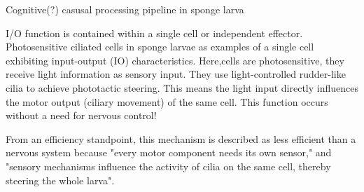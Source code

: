 \documentclass[10pt, aspectratio=169, handout]{beamer}
\begin{document}
\begin{frame}[label=sponge_larva]{ Cognitive(?) casusal processing pipeline in sponge larva}
{
    }

    \begin{center}
    I/O function is contained within a single cell or independent effector. Photosensitive ciliated cells in sponge larvae as examples of a single cell exhibiting input-output (IO) characteristics. Here,cells are photosensitive, they receive light information as sensory input. They use light-controlled rudder-like cilia to achieve phototactic steering. This means the light input directly influences the motor output (ciliary movement) of the same cell.
This function occurs without a need for nervous control!

From an efficiency standpoint, this mechanism is described as less efficient than a nervous system because "every motor component needs its own sensor," and "sensory mechanisms influence the activity of cilia on the same cell, thereby steering the whole larva". \autocite{jekelyOptionSpaceEarly2015}
 
    \end{center}



\end{frame}
\end{document}
